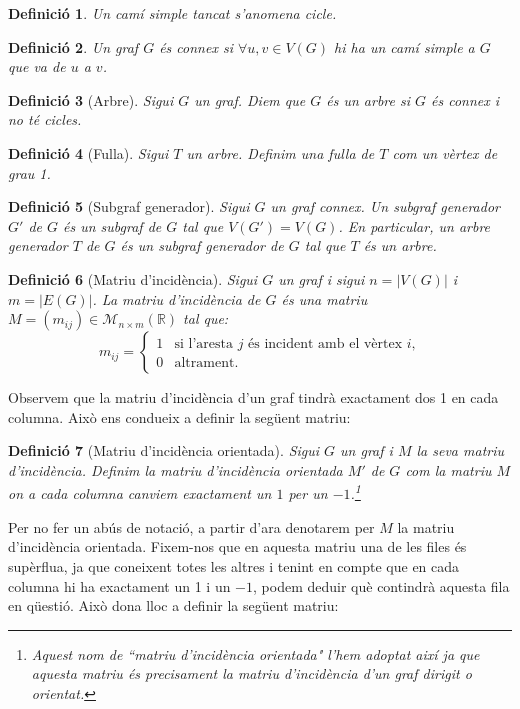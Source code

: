 \documentclass{article}
\newtheorem{definition}{Definició}[section]
\begin{document}
    \begin{definition}
    Un camí simple tancat s'anomena \textit{cicle}.
    \end{definition}
    \begin{definition}
    Un graf $G$ és \textit{connex} si $\forall u,v\in V(G)$ hi ha un camí simple a $G$ que va de $u$ a $v$.
    \end{definition}
    \begin{definition}[Arbre]
        Sigui $G$ un graf. Diem que $G$ és un arbre si $G$ és connex i no té cicles.
    \end{definition}
    \begin{definition}[Fulla]
    Sigui $T$ un arbre. Definim una fulla de $T$ com un vèrtex de grau 1.
    \end{definition}
    \begin{definition}[Subgraf generador]
        Sigui $G$ un graf connex. Un subgraf generador $G'$ de $G$ és un subgraf de $G$ tal que $V(G')=V(G)$. En particular, un arbre generador $T$ de $G$ és un subgraf generador de $G$ tal que $T$ és un arbre.
    \end{definition}
    \begin{definition}[Matriu d'incidència]
        Sigui $G$ un graf i sigui $n=|V(G)|$ i $m=|E(G)|$. La matriu d'incidència de $G$ és una matriu $M=(m_{ij})\in\mathcal{M}_{n\times m}(\mathbb{R})$ tal que:
        $$m_{ij}=\left\{\begin{array}{ll}
            1 & \text{si l'aresta $j$ és incident amb el vèrtex $i$,} \\
            0 & \text{altrament.}
        \end{array}\right.$$
    \end{definition}
    Observem que la matriu d'incidència d'un graf tindrà exactament dos 1 en cada columna. Això ens condueix a definir la següent matriu:
    \begin{definition}[Matriu d'incidència orientada]
    Sigui $G$ un graf i $M$ la seva matriu d'incidència. Definim la matriu d'incidència orientada $M'$ de $G$ com la matriu $M$ on a cada columna canviem exactament un $1$ per un $-1$.\footnote{Aquest nom de ``matriu d'incidència orientada" l'hem adoptat així ja que aquesta matriu és precisament la matriu d'incidència d'un graf dirigit o orientat.} \cite{10}
    \end{definition}
    Per no fer un abús de notació, a partir d'ara denotarem per $M$ la matriu d'incidència orientada. Fixem-nos que en aquesta matriu una de les files és supèrflua, ja que coneixent totes les altres i tenint en compte que en cada columna hi ha exactament un 1 i un $-1$, podem deduir què contindrà aquesta fila en qüestió. Això dona lloc a definir la següent matriu:
\end{document}
